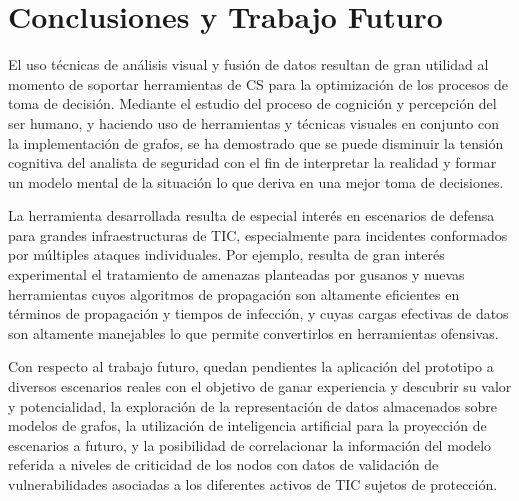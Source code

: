 \documentclass[a4paper]{./plantillas/llncs}
\begin{document}
\section{Conclusiones y Trabajo Futuro}

El uso técnicas de análisis visual y fusión de datos resultan de gran utilidad al momento de soportar herramientas de CS para la optimización de los procesos de toma de decisión. Mediante el estudio del proceso de cognición y percepción del ser humano, y haciendo uso de herramientas y técnicas visuales en conjunto con la implementación de grafos, se ha demostrado que se puede disminuir la tensión cognitiva del analista de seguridad con el fin de interpretar la realidad y formar un modelo mental de la situación lo que deriva en una mejor toma de decisiones. \newline

La herramienta desarrollada resulta de especial interés en escenarios de defensa para grandes infraestructuras de TIC, especialmente para incidentes conformados por múltiples ataques individuales. Por ejemplo, resulta de gran interés experimental el tratamiento de amenazas planteadas por gusanos y nuevas herramientas cuyos algoritmos de propagación son altamente eficientes en términos de propagación y tiempos de infección, y cuyas cargas efectivas de datos son altamente manejables lo que permite convertirlos en herramientas ofensivas. \newline

Con respecto al trabajo futuro, quedan pendientes la aplicación del prototipo a diversos escenarios reales con el objetivo de ganar experiencia y descubrir su valor y potencialidad, la exploración de la representación de datos almacenados sobre modelos de grafos, la utilización de inteligencia artificial para la proyección de escenarios a futuro, y la posibilidad de correlacionar la información del modelo referida a niveles de criticidad de los nodos con datos de validación de vulnerabilidades asociadas a los diferentes activos de TIC sujetos de protección.
\end{document}
